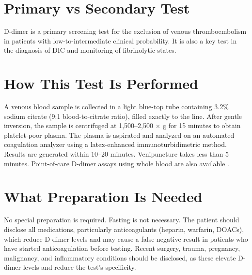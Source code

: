 \section*{Primary vs Secondary Test}
D-dimer is a primary screening test for the exclusion of venous thromboembolism in patients with low-to-intermediate clinical probability. It is also a key test in the diagnosis of DIC and monitoring of fibrinolytic states.

\section*{How This Test Is Performed}
A venous blood sample is collected in a light blue-top tube containing 3.2\% sodium citrate (9:1 blood-to-citrate ratio), filled exactly to the line. After gentle inversion, the sample is centrifuged at 1,500--2,500 $\times$ g for 15 minutes to obtain platelet-poor plasma. The plasma is aspirated and analyzed on an automated coagulation analyzer using a latex-enhanced immunoturbidimetric method. Results are generated within 10--20 minutes. Venipuncture takes less than 5 minutes. Point-of-care D-dimer assays using whole blood are also available \cite{fischbach2023manual}.

\section*{What Preparation Is Needed}
No special preparation is required. Fasting is not necessary. The patient should disclose all medications, particularly anticoagulants (heparin, warfarin, DOACs), which reduce D-dimer levels and may cause a false-negative result in patients who have started anticoagulation before testing. Recent surgery, trauma, pregnancy, malignancy, and inflammatory conditions should be disclosed, as these elevate D-dimer levels and reduce the test's specificity.


